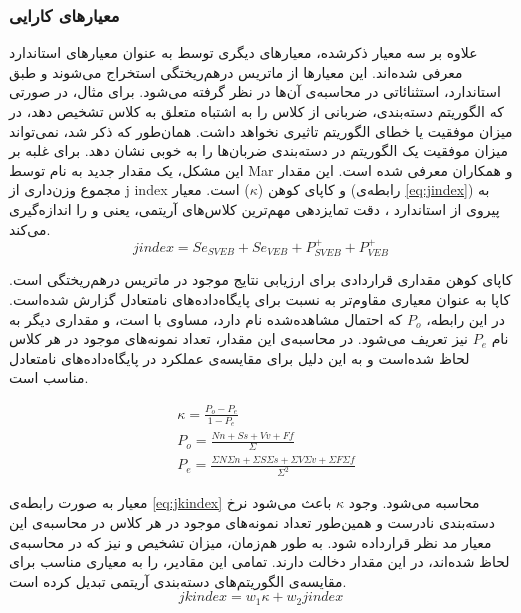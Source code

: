\subsubsection{معیارهای کارایی}
\label{subsec:perf}
علاوه بر سه معیار ذکرشده، معیارهای دیگری توسط  به عنوان معیارهای استاندارد معرفی شده‌اند. این معیارها از ماتریس درهم‌ریختگی استخراج می‌شوند و طبق  استاندارد‌، استثنائاتی در محاسبه‌ی آن‌ها در نظر گرفته می‌شود. برای مثال، در صورتی که الگوریتم دسته‌بندی، ضربانی از کلاس  را به اشتباه متعلق به کلاس  تشخیص دهد، در میزان موفقیت یا خطای الگوریتم تاثیری نخواهد داشت. 
همان‌طور که ذکر شد،  نمی‌تواند میزان موفقیت یک الگوریتم در دسته‌بندی ضربان‌ها را به خوبی نشان دهد. برای غلبه بر این مشکل، یک مقدار جدید به نام  توسط Mar و همکاران معرفی شده است.\cite{Mar2011} این مقدار مجموع وزن‌داری از j index و کاپای کوهن ($\kappa$) است.
معیار  (رابطه‌ی \ref{eq:jindex}) به پیروی از استاندارد ، دقت تمایزدهی مهم‌ترین کلاس‌های آریتمی، یعنی  و  را اندازه‌گیری می‌کند.\cite{Mondejar}
\begin{equation}
	j index = Se_{SVEB} + Se_{VEB} + P^+_{SVEB} + P^+_{VEB}
	\label{eq:jindex}
\end{equation}

کاپای کوهن مقداری قراردادی برای ارزیابی نتایج موجود در ماتریس درهم‌ریختگی است. کاپا به عنوان معیاری مقاوم‌تر به نسبت  برای پایگاه‌داده‌های نامتعادل گزارش شده‌است. در این رابطه، $P_o$ که احتمال مشاهده‌شده نام دارد، مساوی با  است،‌ و مقداری دیگر به نام $P_e$ نیز تعریف می‌شود. در محاسبه‌ی این مقدار، تعداد نمونه‌های موجود در هر کلاس لحاظ شده‌است و به این دلیل برای مقایسه‌ی عملکرد در پایگاه‌داده‌های نامتعادل مناسب است. 

\begin{equation}
\begin{split}
	& \kappa = \frac{P_o - P_e}{1 - P_e} \\
	& P_o = \frac{Nn+Ss+Vv+Ff}{\Sigma} \\
	& P_e = \frac{\Sigma N \Sigma n + \Sigma S \Sigma s + \Sigma V \Sigma v + \Sigma F \Sigma f}{\Sigma^2}
\end{split}
\end{equation}

معیار  به صورت رابطه‌ی \ref{eq:jkindex} محاسبه می‌شود. وجود $\kappa$ باعث می‌شود نرخ دسته‌بندی نادرست و همین‌طور تعداد نمونه‌های موجود در هر کلاس در محاسبه‌ی این معیار مد نظر قرارداده شود. به طور هم‌زمان، میزان تشخیص  و  نیز که در محاسبه‌ی  لحاظ شده‌اند،‌ در این مقدار دخالت دارند. تمامی این مقادیر،‌  را به معیاری مناسب برای مقایسه‌ی الگوریتم‌های دسته‌بندی آریتمی تبدیل کرده است.  
\begin{equation}
	jk index = w_1\kappa + w_2j index
\label{eq:jkindex}
\end{equation}



